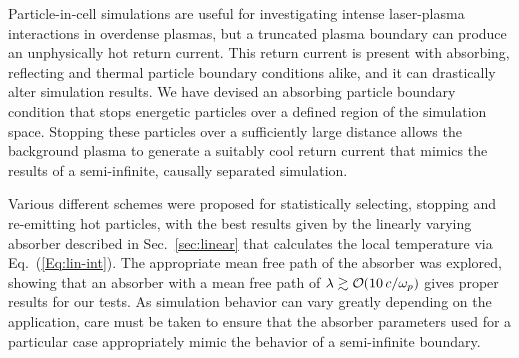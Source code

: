\documentclass[../absorber.tex]{subfiles}
\begin{document}
Particle-in-cell simulations are useful for investigating intense laser-plasma interactions in overdense plasmas, but a truncated plasma boundary can produce an unphysically hot return current.  This return current is present with absorbing, reflecting and thermal particle boundary conditions alike, and it can drastically alter simulation results.  We have devised an absorbing particle boundary condition that stops energetic particles over a defined region of the simulation space.  Stopping these particles over a sufficiently large distance allows the background plasma to generate a suitably cool return current that mimics the results of a semi-infinite, causally separated simulation.

Various different schemes were proposed for statistically selecting, stopping and re-emitting hot particles, with the best results given by the linearly varying absorber described in Sec.~\ref{sec:linear} that calculates the local temperature via Eq.~(\ref{Eq:lin-int}).  The appropriate mean free path of the absorber was explored, showing that an absorber with a mean free path of $\lambda \gtrsim \bigO(10\,c/\omega_p)$ gives proper results for our tests.
As simulation behavior can vary greatly depending on the application, care must be taken to ensure that the absorber parameters used for a particular case appropriately mimic the behavior of a semi-infinite boundary.
\end{document}
